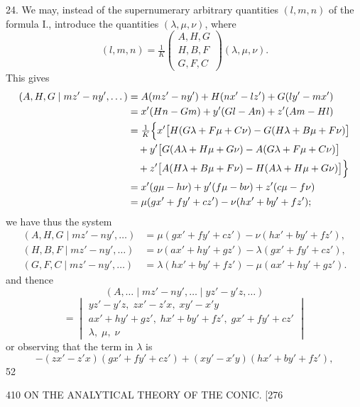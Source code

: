 \documentclass[11pt]{article}
\begin{document}
\textsc{24.} We may, instead of the supernumerary arbitrary quantities $(l,m,n)$ of the
formula \textsc{I.}, introduce the quantities $(\lambda,\mu,\nu)$, where
\[ (l,m,n)=\tfrac{1}{K}\!\begin{pmatrix}A,H,G\\ H,B,F\\ G,F,C\end{pmatrix}\!(\lambda,\mu,\nu). \]
This gives
\[ \begin{aligned}
(A,H,G \mid mz'-ny',\dots) &= A(mz'-ny')+H(nx'-lz')+G(ly'-mx')\\
&= x'(Hn-Gm)+y'(Gl-An)+z'(Am-Hl)\\
&= \tfrac{1}{K}\Bigl\{x'\bigl[H(G\lambda+F\mu+C\nu)-G(H\lambda+B\mu+F\nu)\bigr]\\
&\quad +y'\bigl[G(A\lambda+H\mu+G\nu)-A(G\lambda+F\mu+C\nu)\bigr]\\
&\quad +z'\bigl[A(H\lambda+B\mu+F\nu)-H(A\lambda+H\mu+G\nu)\bigr]\Bigr\}\\
&= x'(g\mu-h\nu)+y'(f\mu-b\nu)+z'(c\mu-f\nu)\\
&= \mu(gx'+fy'+cz')-\nu(hx'+by'+fz');
\end{aligned} \]
we have thus the system
\[ \begin{aligned}
(A,H,G \mid mz'-ny',\dots) &= \mu(gx'+fy'+cz')-\nu(hx'+by'+fz'),\\
(H,B,F \mid mz'-ny',\dots) &= \nu(ax'+hy'+gz')-\lambda(gx'+fy'+cz'),\\
(G,F,C \mid mz'-ny',\dots) &= \lambda(hx'+by'+fz')-\mu(ax'+hy'+gz').
\end{aligned} \]
and thence
\[ (A,\dots \mid mz'-ny',\dots \mid yz'-y'z,\dots) \]
\[ = \begin{vmatrix}
yz'-y'z,\;zx'-z'x,\;xy'-x'y\\
ax'+hy'+gz',\;hx'+by'+fz',\;gx'+fy'+cz'\\
\lambda,\;\mu,\;\nu
\end{vmatrix} \]
or observing that the term in $\lambda$ is
\[ -(zx'-z'x)(gx'+fy'+cz')+(xy'-x'y)(hx'+by'+fz'), \]
\hfill 52

\begin{center}
410 \hfill ON THE ANALYTICAL THEORY OF THE CONIC. \hfill \textsc{[276}
\end{center}
\end{document}
